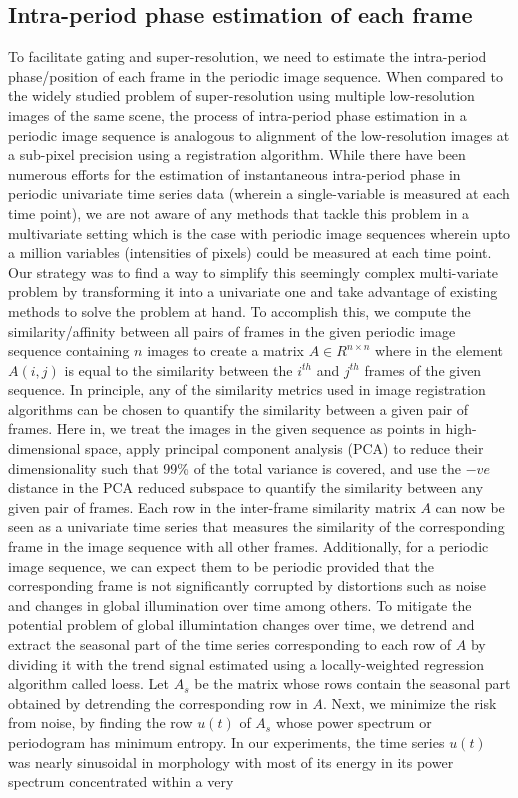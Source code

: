 \documentclass[runningheads,a4paper]{llncs}
\begin{document}
\subsection{Intra-period phase estimation of each frame}
\label{sec:method:phase_estimation}
%
To facilitate gating and super-resolution, we need to estimate the intra-period phase/position of each frame in the periodic image sequence. When compared to the widely studied problem of super-resolution using multiple low-resolution images of the same scene\cite{Nasrollahi2014}, the process of intra-period phase estimation in a periodic image sequence is analogous to alignment of the low-resolution images at a sub-pixel precision using a registration algorithm. While there have been numerous efforts for the estimation of instantaneous intra-period phase\cite{Lu2013} in periodic univariate time series data (wherein a single-variable is measured at each time point), we are not aware of any methods that tackle this problem in a multivariate setting which is the case with periodic image sequences wherein upto a million variables (intensities of pixels) could be measured at each time point. Our strategy was to find a way to simplify this seemingly complex multi-variate problem by transforming it into a univariate one and take advantage of existing methods to solve the problem at hand. To accomplish this, we compute the similarity/affinity between all pairs of frames in the given periodic image sequence containing $n$ images to create a matrix $A \in R^{n \times n}$ where in the element $A(i,j)$ is equal to the similarity between the $i^{th}$ and $j^{th}$ frames of the given sequence. In principle, any of the similarity metrics used in image registration algorithms can be chosen to quantify the similarity between a given pair of frames. Here in, we treat the images in the given sequence as points in high-dimensional space, apply principal component analysis (PCA) to reduce their dimensionality\cite{Bishop2006} such that 99\% of the total variance is covered, and use the $-ve$ distance in the PCA reduced subspace to quantify the similarity between any given pair of frames. Each row in the inter-frame similarity matrix $A$ can now be seen as a univariate time series that measures the similarity of the corresponding frame in the image sequence with all other frames. Additionally, for a periodic image sequence, we can expect them to be periodic provided that the corresponding frame is not significantly corrupted by distortions such as noise and changes in global illumination over time among others. To mitigate the potential problem of global illumintation changes over time, we detrend and extract the seasonal part of the time series corresponding to each row of $A$ by dividing it with the trend signal estimated using a locally-weighted regression algorithm called loess\cite{Cleveland1990}. Let $A_s$ be the matrix whose rows contain the seasonal part obtained by detrending the corresponding row in $A$. Next, we minimize the risk from noise, by finding the row $u(t)$ of $A_s$ whose power spectrum or periodogram has minimum entropy. In our experiments, the time series $u(t)$ was nearly sinusoidal in morphology with most of its energy in its power spectrum concentrated within a very 
\end{document}
